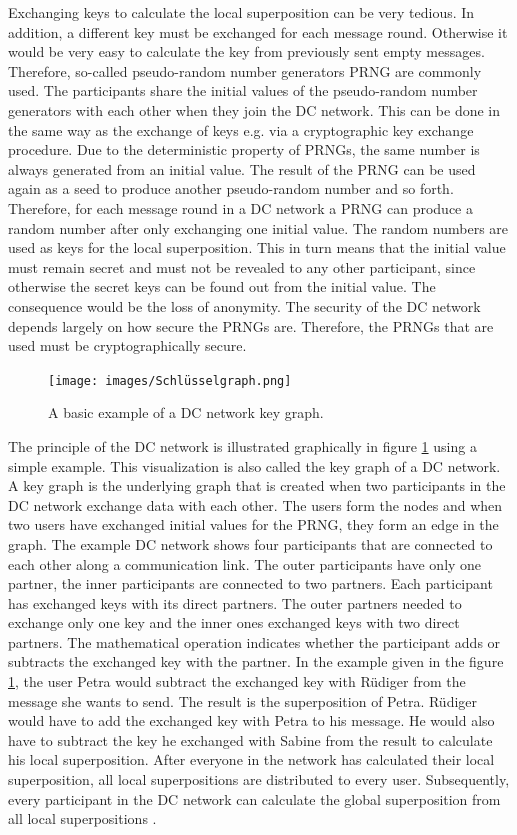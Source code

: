 Exchanging keys to calculate the local superposition can be very tedious. In addition, a different key must be exchanged for each message round. Otherwise it would be very easy to calculate the key from previously sent empty messages. Therefore, so-called pseudo-random number generators \gls{PRNG} are commonly used. The participants share the initial values of the pseudo-random number generators with each other when they join the DC network. This can be done in the same way as the exchange of keys e.g. via a cryptographic key exchange procedure. Due to the deterministic property of \gls{PRNG}s, the same number is always generated from an initial value. The result of the \gls{PRNG} can be used again as a seed to produce another pseudo-random number and so forth. Therefore, for each message round in a DC network a \gls{PRNG} can produce a random number after only exchanging one initial value. The random numbers are used as keys for the local superposition. This in turn means that the initial value must remain secret and must not be revealed to any other participant, since otherwise the secret keys can be found out from the initial value. The consequence would be the loss of anonymity. The security of the DC network depends largely on how secure the \gls{PRNG}s are. Therefore, the \gls{PRNG}s that are used must be cryptographically secure.\\
\begin{figure}[tbp]
  \centering
  \texttt{[image: images/Schlüsselgraph.png]}
  \caption[DC Network Key Graph]{A basic example of a DC network key graph\cite{stephan_escher}.}
  \label{fig:keygraph}
\end{figure}The principle of the DC network is illustrated graphically in figure \ref{fig:keygraph} using a simple example. This visualization is also called the key graph of a DC network. A key graph is the underlying graph that is created when two participants in the DC network exchange data with each other. The users form the nodes and when two users have exchanged initial values for the \gls{PRNG}, they form an edge in the graph. The example DC network shows four participants that are connected to each other along a communication link. The outer participants have only one partner, the inner participants are connected to two partners. Each participant has exchanged keys with its direct partners. The outer partners needed to exchange only one key and the inner ones exchanged keys with two direct partners.
The mathematical operation indicates whether the participant adds or subtracts the exchanged key with the partner. In the example given in the figure \ref{fig:keygraph}, the user Petra would subtract the exchanged key with Rüdiger from the message she wants to send. The result is the superposition of Petra. Rüdiger would have to add the exchanged key with Petra to his message. He would also have to subtract the key he exchanged with Sabine from the result to calculate his local superposition. After everyone in the network has calculated their local superposition, all local superpositions are distributed to every user. Subsequently, every participant in the DC network can calculate the global superposition from all local superpositions \cite{stephan_escher}\cite{pfitzmann2006security}.

